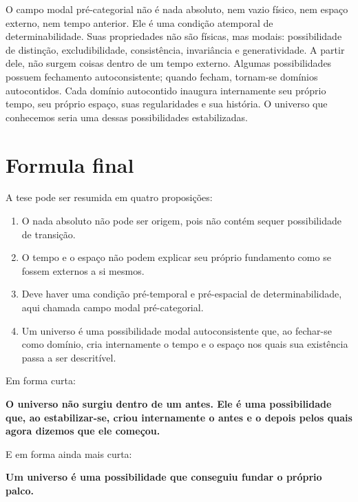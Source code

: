 \documentclass[11pt,a4paper]{article}
\newenvironment{claimbox}{\begin{framed}\small}{\end{framed}}
\newenvironment{corebox}{\begin{framed}\small\bfseries}{\end{framed}}
\begin{document}
\begin{claimbox}
O campo modal pré-categorial não é nada absoluto, nem vazio físico, nem espaço externo, nem tempo anterior. Ele é uma condição atemporal de determinabilidade. Suas propriedades não são físicas, mas modais: possibilidade de distinção, excludibilidade, consistência, invariância e generatividade. A partir dele, não surgem coisas dentro de um tempo externo. Algumas possibilidades possuem fechamento autoconsistente; quando fecham, tornam-se domínios autocontidos. Cada domínio autocontido inaugura internamente seu próprio tempo, seu próprio espaço, suas regularidades e sua história. O universo que conhecemos seria uma dessas possibilidades estabilizadas.
\end{claimbox}

\section{Formula final}

A tese pode ser resumida em quatro proposições:

\begin{enumerate}
    \item O nada absoluto não pode ser origem, pois não contém sequer possibilidade de transição.
    \item O tempo e o espaço não podem explicar seu próprio fundamento como se fossem externos a si mesmos.
    \item Deve haver uma condição pré-temporal e pré-espacial de determinabilidade, aqui chamada campo modal pré-categorial.
    \item Um universo é uma possibilidade modal autoconsistente que, ao fechar-se como domínio, cria internamente o tempo e o espaço nos quais sua existência passa a ser descritível.
\end{enumerate}

Em forma curta:

\begin{corebox}
O universo não surgiu dentro de um antes. Ele é uma possibilidade que, ao estabilizar-se, criou internamente o antes e o depois pelos quais agora dizemos que ele começou.
\end{corebox}

E em forma ainda mais curta:

\begin{corebox}
Um universo é uma possibilidade que conseguiu fundar o próprio palco.
\end{corebox}
\end{document}
